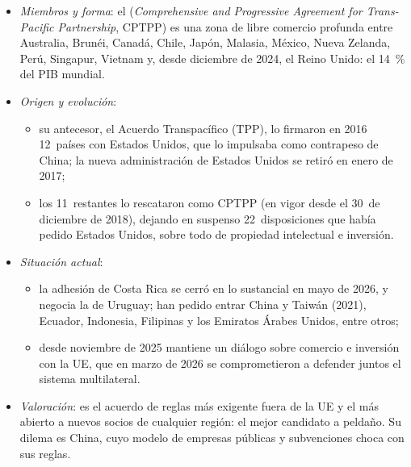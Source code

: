 \documentclass[11pt]{article}
\begin{document}
\begin{itemize}
\item \emph{Miembros y forma}: el  (\emph{Comprehensive and Progressive Agreement for Trans-Pacific Partnership}, CPTPP) es una zona de libre comercio profunda entre Australia, Brunéi, Canadá, Chile, Japón, Malasia, México, Nueva Zelanda, Perú, Singapur, Vietnam y, desde diciembre de 2024, el Reino Unido: el 14~\% del PIB mundial.
\item \emph{Origen y evolución}:
  \begin{itemize}
  \item su antecesor, el Acuerdo Transpacífico (TPP), lo firmaron en 2016 12~países con Estados Unidos, que lo impulsaba como contrapeso de China; la nueva administración de Estados Unidos se retiró en enero de 2017;
  \item los 11~restantes lo rescataron como CPTPP (en vigor desde el 30~de diciembre de 2018), dejando en suspenso 22~disposiciones que había pedido Estados Unidos, sobre todo de propiedad intelectual e inversión.
  \end{itemize}
\item \emph{Situación actual}:
  \begin{itemize}
  \item la adhesión de Costa Rica se cerró en lo sustancial en mayo de 2026, y negocia la de Uruguay; han pedido entrar China y Taiwán (2021), Ecuador, Indonesia, Filipinas y los Emiratos Árabes Unidos, entre otros\nocite{DFAT2026CPTPP};
  \item desde noviembre de 2025 mantiene un diálogo sobre comercio e inversión con la UE, que en marzo de 2026 se comprometieron a defender juntos el sistema multilateral\nocite{UK2026CPTPPUE}.
  \end{itemize}
\item \emph{Valoración}: es el acuerdo de reglas más exigente fuera de la UE y el más abierto a nuevos socios de cualquier región: el mejor candidato a peldaño. Su dilema es China, cuyo modelo de empresas públicas y subvenciones choca con sus reglas.
\end{itemize}
\end{document}
